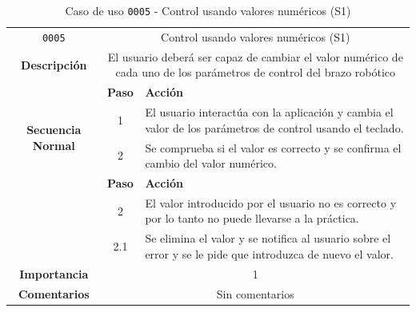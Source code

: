 \begin{table}[H]
    \centering
    \begin{tabularx}{\textwidth}{|c|c|X|}
        \cline{1-3}
        \texttt{0005}                              & \multicolumn{2}{c|}{Control usando valores numéricos (\ac{S1})}                                                                                                                      \\ \cline{1-3}
        \textbf{Descripción}                       & \multicolumn{2}{m{13cm}|}{El usuario deberá ser capaz de cambiar el valor numérico de cada uno de los parámetros de control del brazo robótico}
        \\ \cline{1-3}
        \multirow{4}{*}{\textbf{Secuencia Normal}} & \textbf{Paso}                                                                                                                                        & \textbf{Acción}
        \\ \cline{2-3}                    &   1  & El usuario interactúa con la aplicación y cambia el valor de los parámetros de control usando el teclado.
        \\ \cline{2-3}                    &   2  & Se comprueba si el valor es correcto y se confirma el cambio del valor numérico.
        \\ \cline{1-3}
        \multirow{2}{*}{\textbf{Excepciones}} & \textbf{Paso}  & \textbf{Acción}
        \\ \cline{2-3}                        &   2  & El valor introducido por el usuario no es correcto y por lo tanto no puede llevarse a la práctica.
        \\ \cline{2-3} 
                                              &  2.1 & Se elimina el valor y se notifica al usuario sobre el error y se le pide que introduzca de nuevo el valor.
        \\ \cline{1-3}
        \textbf{Importancia}                       & \multicolumn{2}{c|}{1}                                                                                                                                                 \\ \cline{1-3}
        \textbf{Comentarios}                       & \multicolumn{2}{c|}{Sin comentarios}                                                                                                                                   \\ \cline{1-3}
    \end{tabularx}
    \caption{Caso de uso \texttt{0005} - Control usando valores numéricos (\ac{S1})}
    \label{tab:CU0005}
    \label{tab:caso_de_uso_control_usando_valores_numericos}
\end{table}

